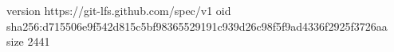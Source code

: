 version https://git-lfs.github.com/spec/v1
oid sha256:d715506e9f542d815c5bf98365529191c939d26c98f5f9ad4336f2925f3726aa
size 2441
